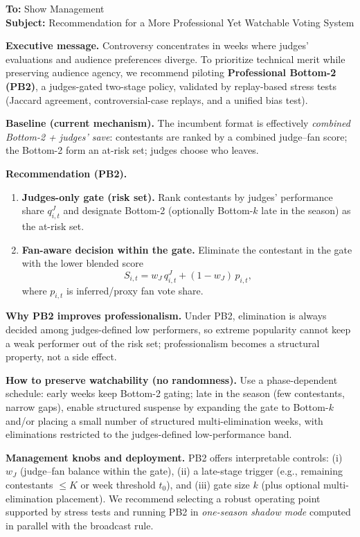\noindent \textbf{To:} Show Management \\
\textbf{Subject:} Recommendation for a More Professional Yet Watchable Voting System

\vspace{4pt}
\noindent \textbf{Executive message.}
Controversy concentrates in weeks where judges' evaluations and audience preferences diverge.
To prioritize technical merit while preserving audience agency, we recommend piloting
\textbf{Professional Bottom-2 (PB2)}, a judges-gated two-stage policy, validated by replay-based stress tests
(Jaccard agreement, controversial-case replays, and a unified bias test). \cite{comap2026_problemC_pdf}

\vspace{6pt}
\noindent \textbf{Baseline (current mechanism).}
The incumbent format is effectively \emph{combined Bottom-2 + judges' save}:
contestants are ranked by a combined judge--fan score; the Bottom-2 form an at-risk set; judges choose who leaves. \cite{comap2026_problemC_pdf}

\vspace{6pt}
\noindent \textbf{Recommendation (PB2).}
\begin{enumerate}
  \item \textbf{Judges-only gate (risk set).} Rank contestants by judges' performance share $q^{J}_{i,t}$ and designate Bottom-2
  (optionally Bottom-$k$ late in the season) as the at-risk set.
  \item \textbf{Fan-aware decision within the gate.} Eliminate the contestant in the gate with the lower blended score
  \[
    S_{i,t}= w_J\, q^{J}_{i,t} + (1-w_J)\, p_{i,t},
  \]
  where $p_{i,t}$ is inferred/proxy fan vote share. \cite{comap2026_problemC_pdf}
\end{enumerate}

\vspace{6pt}
\noindent \textbf{Why PB2 improves professionalism.}
Under PB2, elimination is always decided among judges-defined low performers, so extreme popularity cannot
keep a weak performer out of the risk set; professionalism becomes a structural property, not a side effect. \cite{comap2026_problemC_pdf}

\vspace{6pt}
\noindent \textbf{How to preserve watchability (no randomness).}
Use a phase-dependent schedule: early weeks keep Bottom-2 gating; late in the season (few contestants, narrow gaps),
enable structured suspense by expanding the gate to Bottom-$k$ and/or placing a small number of structured multi-elimination weeks,
with eliminations restricted to the judges-defined low-performance band. \cite{comap2026_problemC_pdf}

\vspace{6pt}
\noindent \textbf{Management knobs and deployment.}
PB2 offers interpretable controls: (i) $w_J$ (judge--fan balance within the gate),
(ii) a late-stage trigger (e.g., remaining contestants $\le K$ or week threshold $t_0$),
and (iii) gate size $k$ (plus optional multi-elimination placement).
We recommend selecting a robust operating point supported by stress tests and running PB2 in \emph{one-season shadow mode}
computed in parallel with the broadcast rule. \cite{comap2026_problemC_pdf}

